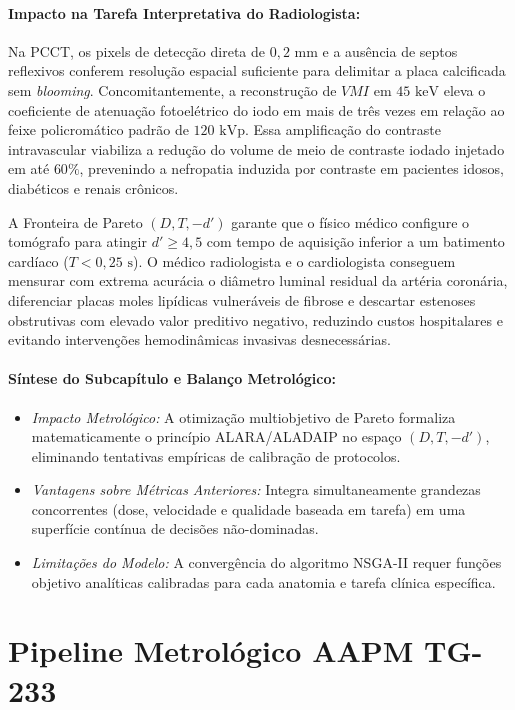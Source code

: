 \documentclass[
  12pt,
  a4paper,
  oneside
]{report}
\begin{document}
\paragraph{Impacto na Tarefa Interpretativa do Radiologista:} Na PCCT, os pixels de detecção direta de $0{,}2\text{ mm}$ e a ausência de septos reflexivos conferem resolução espacial suficiente para delimitar a placa calcificada sem \emph{blooming}. Concomitantemente, a reconstrução de $VMI$ em $45\text{ keV}$ eleva o coeficiente de atenuação fotoelétrico do iodo em mais de três vezes em relação ao feixe policromático padrão de $120\text{ kVp}$. Essa amplificação do contraste intravascular viabiliza a redução do volume de meio de contraste iodado injetado em até $60\%$, prevenindo a nefropatia induzida por contraste em pacientes idosos, diabéticos e renais crônicos.

A Fronteira de Pareto $(D, T, -d')$ garante que o físico médico configure o tomógrafo para atingir $d' \ge 4{,}5$ com tempo de aquisição inferior a um batimento cardíaco ($T < 0{,}25\text{ s}$). O médico radiologista e o cardiologista conseguem mensurar com extrema acurácia o diâmetro luminal residual da artéria coronária, diferenciar placas moles lipídicas vulneráveis de fibrose e descartar estenoses obstrutivas com elevado valor preditivo negativo, reduzindo custos hospitalares e evitando intervenções hemodinâmicas invasivas desnecessárias.

\paragraph{Síntese do Subcapítulo e Balanço Metrológico:}
\begin{itemize}
  \item \emph{Impacto Metrológico:} A otimização multiobjetivo de Pareto formaliza matematicamente o princípio ALARA/ALADAIP no espaço $(D, T, -d')$, eliminando tentativas empíricas de calibração de protocolos.
  \item \emph{Vantagens sobre Métricas Anteriores:} Integra simultaneamente grandezas concorrentes (dose, velocidade e qualidade baseada em tarefa) em uma superfície contínua de decisões não-dominadas.
  \item \emph{Limitações do Modelo:} A convergência do algoritmo NSGA-II requer funções objetivo analíticas calibradas para cada anatomia e tarefa clínica específica.
\end{itemize}

\section{Pipeline Metrológico AAPM TG-233}
\label{sec:pipeline_tg233_completo}
\end{document}
